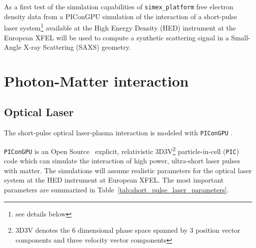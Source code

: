 \documentclass[12pt]{scrartcl}
\begin{document}
As a first test of the simulation capabilities of \texttt{simex\_platform}
free electron density data from a PIConGPU simulation of the interaction of a
short-pulse laser system\footnote{see details below} available at the High
Energy Density (HED) instrument \cite{Nakatsutsumi2014} at the European XFEL
will be used to compute a synthetic scattering signal in a Small-Angle X-ray
Scattering (SAXS) geometry.
%
\section{Photon-Matter interaction}
\subsection{Optical Laser}
The short-pulse
optical laser-plasma interaction is modeled with \texttt{PIConGPU}
\cite{Bussmann2013}.

\texttt{PIConGPU} is an Open Source~\cite{picongpu_github} explicit,
relativistic 3D3V\footnote{3D3V denotes the 6 dimensional phase space spanned by 3 position
vector components and three velocity vector components} particle-in-cell (\texttt{PIC}) code which can simulate the
interaction of high power, ultra-short laser pulses with matter.  The
simulations will assume realistic parameters for the optical laser system at the
HED instrument at European XFEL. The most important parameters are summarized in
Table~\ref{tab:short_pulse_laser_parameters}.
\end{document}
